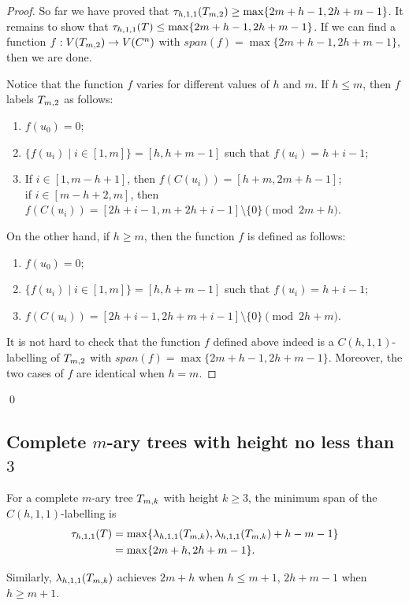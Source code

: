 \begin{proof}
So far we have proved that $\t_{h,1,1}(\tm2) \ge  \max\{2m+h-1, 2h+m-1\}$. It remains to show that $\tau_{h,1,1}(T) \le \max\{2m+h-1, 2h+m-1\}$. If we can find a function $f : V(\tm2) \rightarrow V(C^n)$ with $span(f) = \max\{2m+h-1, 2h+m-1\}$, then we are done. 

Notice that the function $f$ varies for different values of $h$ and $m$. If $h \le m$, then $f$ labels $\tm2$ as follows: 
\begin{enumerate}[(1)]
\item $f(u_0) = 0$;
\item $\{f(u_i) \mid i \in [1,m]\} = [h,h+m-1]$ such that $f(u_i) = h+i-1$;
\item If $i \in [1, m-h+1]$, then $f(C(u_i)) = [h+m, 2m+h-1]$; \\if $i \in [m-h+2, m]$, then $f(C(u_i)) = [2h+i-1, m+2h+i-1] \setminus \{0\}  \pmod {2m+h}$.
\end{enumerate}
On the other hand, if $h \ge m$, then the function $f$ is defined as follows: 
\begin{enumerate}[(1)]
\item $f(u_0) = 0$;
\item $\{f(u_i) \mid i \in [1,m]\} = [h,h+m-1]$ such that $f(u_i) = h+i-1$;
\item $f(C(u_i)) = [2h+i-1, 2h+m+i-1] \setminus \{0\} \pmod {2h+m}$.
\end{enumerate}

It is not hard to check that the function $f$ defined above indeed is a $C(h,1,1)$-labelling of $\tm2$ with $span(f) = \max\{2m+h-1, 2h+m-1\}$. Moreover, the two cases of $f$ are identical when $h = m$. 
\end{proof}
\qed


\subsection{Complete $m$-ary trees with height no less than $3$}
\begin{theorem}
\label{thm:ck3}
For a complete $m$-ary tree $T_{m,k}$ with height $k \ge 3$, the minimum span of the $C(h,1,1)$-labelling is \begin{align}
\tau_{h,1,1}(T) & = \max\{\lambda_{h,1,1}(T_{m,k}), \lambda_{h,1,1}(T_{m,k})+h-m-1\} \\
\label{eq:bd1}
&= \max\{2m+h, 2h+m-1\}.
\end{align}
\end{theorem}

Similarly, $\lambda_{h,1,1}(T_{m,k})$ achieves $2m+h$ when $h \le m+1$, $2h+m-1$ when $h \ge m+1$. 

